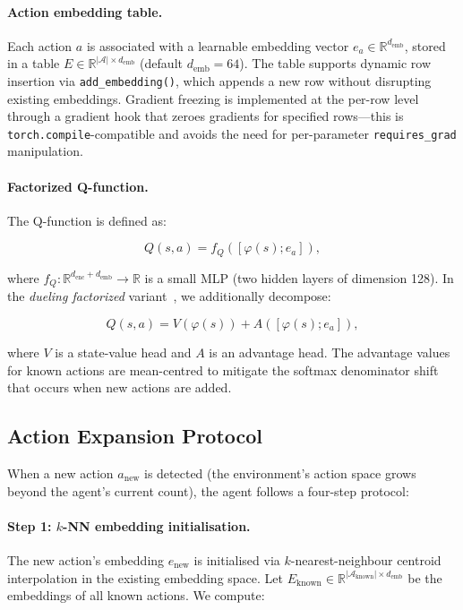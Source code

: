 \documentclass{article}
\begin{document}
\paragraph{Action embedding table.} Each action $a$ is associated with a learnable embedding vector $e_a \in \mathbb{R}^{d_\text{emb}}$, stored in a table $E \in \mathbb{R}^{|\mathcal{A}| \times d_\text{emb}}$ (default $d_\text{emb}=64$). The table supports dynamic row insertion via \texttt{add\_embedding()}, which appends a new row without disrupting existing embeddings. Gradient freezing is implemented at the per-row level through a gradient hook that zeroes gradients for specified rows---this is \texttt{torch.compile}-compatible and avoids the need for per-parameter \texttt{requires\_grad} manipulation.

\paragraph{Factorized Q-function.} The Q-function is defined as:

\begin{equation}
Q(s,a) = f_Q([\varphi(s); e_a]), \label{eq:factorized}
\end{equation}

where $f_Q: \mathbb{R}^{d_\text{enc} + d_\text{emb}} \to \mathbb{R}$ is a small MLP (two hidden layers of dimension 128). In the \emph{dueling factorized} variant~\cite{wang2016dueling}, we additionally decompose:

\begin{equation}
Q(s,a) = V(\varphi(s)) + A([\varphi(s); e_a]), \label{eq:dueling}
\end{equation}

where $V$ is a state-value head and $A$ is an advantage head. The advantage values for known actions are mean-centred to mitigate the softmax denominator shift that occurs when new actions are added.

\subsection{Action Expansion Protocol}

When a new action $a_\text{new}$ is detected (the environment's action space grows beyond the agent's current count), the agent follows a four-step protocol:

\paragraph{Step 1: $k$-NN embedding initialisation.} The new action's embedding $e_\text{new}$ is initialised via $k$-nearest-neighbour centroid interpolation in the existing embedding space. Let $E_\text{known} \in \mathbb{R}^{|\mathcal{A}_\text{known}| \times d_\text{emb}}$ be the embeddings of all known actions. We compute:
\end{document}
